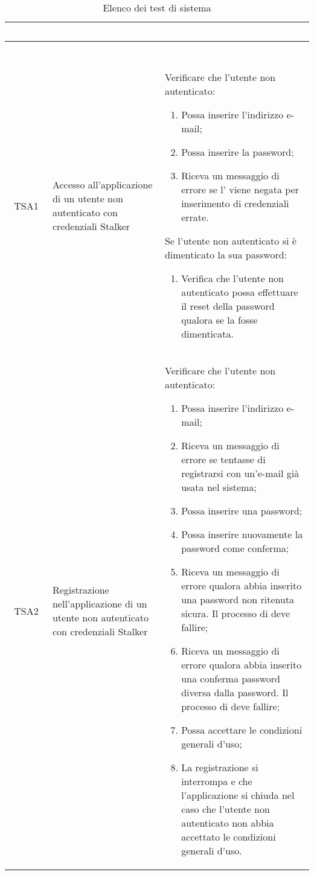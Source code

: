 {
\renewcommand{\arraystretch}{1.5}
\centering
\begin{longtable}{ c  C{3cm}  C{11cm} }
\caption{Elenco dei test di sistema}\\
\textcolor{white}{\textbf{Codice}} & \textcolor{white}{\textbf{Titolo}} & \textcolor{white}{\textbf{Descrizione}} \\
\endfirsthead
{}
\textcolor{white}{\textbf{Codice}} & \textcolor{white}{\textbf{Titolo}} & \textcolor{white}{\textbf{Descrizione}} \\
\endhead

TSA1 & Accesso all'applicazione di un utente non autenticato con credenziali Stalker &
Verificare che l'utente non autenticato:
\begin{enumerate}
    \item Possa inserire l'indirizzo e-mail;
    \item Possa inserire la password;
    \item Riceva un messaggio di errore se l' viene negata per inserimento di credenziali errate.
\end{enumerate}
Se l'utente non autenticato si è dimenticato la sua password:
\begin{enumerate}
    \item Verifica che l'utente non autenticato possa effettuare il reset della password qualora se la fosse dimenticata.
\end{enumerate} \\

TSA2 & Registrazione nell'applicazione di un utente non autenticato con credenziali Stalker &
Verificare che l'utente non autenticato:
\begin{enumerate}
    \item Possa inserire l'indirizzo e-mail;
    \item Riceva un messaggio di errore se tentasse di registrarsi con un'e-mail già usata nel sistema;
    \item Possa inserire una password;
    \item Possa inserire nuovamente la password come conferma;
    \item Riceva un messaggio di errore qualora abbia inserito una password non ritenuta sicura. Il processo di  deve fallire;
    \item Riceva un messaggio di errore qualora abbia inserito una conferma password diversa dalla password. Il processo di  deve fallire;
    \item Possa accettare le condizioni generali d'uso;
    \item La registrazione si interrompa e che l'applicazione si chiuda nel caso che l'utente non autenticato non abbia accettato le condizioni generali d'uso.
\end{enumerate} \\


\end{longtable}}
